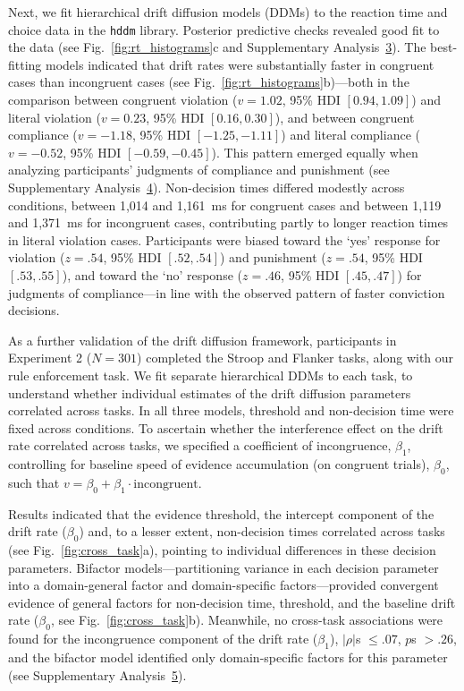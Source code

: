 \documentclass[pdflatex,sn-nature]{sn-jnl}
\begin{document}
Next, we fit hierarchical drift diffusion models (DDMs) to the reaction time and choice data in the \texttt{hddm} library\cite{ref16}. Posterior predictive checks revealed good fit to the data (see Fig.~\ref{fig:rt_histograms}c and Supplementary Analysis~\hyperref[supp:analysis3]{3}). The best-fitting models indicated that drift rates were substantially faster in congruent cases than incongruent cases (see Fig.~\ref{fig:rt_histograms}b)---both in the comparison between congruent violation ($v = 1.02$, 95\% HDI $[0.94, 1.09]$) and literal violation ($v = 0.23$, 95\% HDI $[0.16, 0.30]$), and between congruent compliance ($v = -1.18$, 95\% HDI $[-1.25, -1.11]$) and literal compliance ($v = -0.52$, 95\% HDI $[-0.59, -0.45]$). This pattern emerged equally when analyzing participants' judgments of compliance and punishment (see Supplementary Analysis~\hyperref[supp:analysis4]{4}). Non-decision times differed modestly across conditions, between 1,014 and 1,161~ms for congruent cases and between 1,119 and 1,371~ms for incongruent cases, contributing partly to longer reaction times in literal violation cases. Participants were biased toward the `yes' response for violation ($z = .54$, 95\% HDI $[.52, .54]$) and punishment ($z = .54$, 95\% HDI $[.53, .55]$), and toward the `no' response ($z = .46$, 95\% HDI $[.45, .47]$) for judgments of compliance---in line with the observed pattern of faster conviction decisions. 

As a further validation of the drift diffusion framework, participants in Experiment 2 ($N = 301$) completed the Stroop and Flanker tasks, along with our rule enforcement task. We fit separate hierarchical DDMs to each task, to understand whether individual estimates of the drift diffusion parameters correlated across tasks. In all three models, threshold and non-decision time were fixed across conditions. To ascertain whether the interference effect on the drift rate correlated across tasks, we specified a coefficient of incongruence, $\beta_1$, controlling for baseline speed of evidence accumulation (on congruent trials), $\beta_0$, such that $v = \beta_0 + \beta_1 \cdot \text{incongruent}$. 

Results indicated that the evidence threshold, the intercept component of the drift rate ($\beta_0$) and, to a lesser extent, non-decision times correlated across tasks (see Fig.~\ref{fig:cross_task}a), pointing to individual differences in these decision parameters. Bifactor models---partitioning variance in each decision parameter into a domain-general factor and domain-specific factors---provided convergent evidence of general factors for non-decision time, threshold, and the baseline drift rate ($\beta_0$, see Fig.~\ref{fig:cross_task}b). Meanwhile, no cross-task associations were found for the incongruence component of the drift rate ($\beta_1$), $|\rho|$s $\leq .07$, $p$s $> .26$, and the bifactor model identified only domain-specific factors for this parameter (see Supplementary Analysis~\hyperref[supp:analysis5]{5}). 
\end{document}
